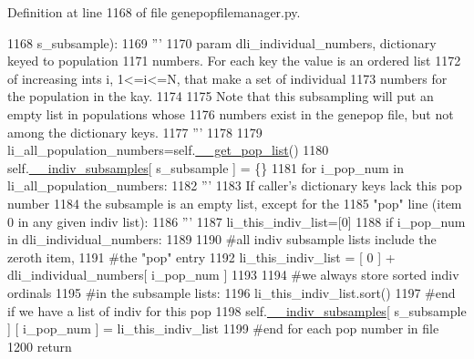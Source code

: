 Definition at line 1168 of file genepopfilemanager.\+py.


\begin{DoxyCode}
1168             s\_subsample):
1169         \textcolor{stringliteral}{'''}
1170 \textcolor{stringliteral}{        param dli\_individual\_numbers, dictionary keyed to population}
1171 \textcolor{stringliteral}{                numbers.  For each key the value is an ordered list}
1172 \textcolor{stringliteral}{                of increasing ints i, 1<=i<=N, that make a set of individual}
1173 \textcolor{stringliteral}{                numbers for the population in the kay.}
1174 \textcolor{stringliteral}{}
1175 \textcolor{stringliteral}{        Note that this subsampling will put an empty list in populations whose}
1176 \textcolor{stringliteral}{        numbers exist in the genepop file, but not among the dictionary keys.}
1177 \textcolor{stringliteral}{        '''}
1178 
1179         li\_all\_population\_numbers=self.\hyperlink{classnegui_1_1genepopfilemanager_1_1GenepopFileManager_a0cd3178624c652968b4d319f12e5df6e}{\_\_get\_pop\_list}()
1180         self.\hyperlink{classnegui_1_1genepopfilemanager_1_1GenepopFileManager_a1e8379bcee4902ca9314ff53fcb71644}{\_\_indiv\_subsamples}[ s\_subsample ] = \{\}
1181         \textcolor{keywordflow}{for} i\_pop\_num \textcolor{keywordflow}{in} li\_all\_population\_numbers:
1182             \textcolor{stringliteral}{'''}
1183 \textcolor{stringliteral}{            If caller's dictionary keys lack this pop number}
1184 \textcolor{stringliteral}{            the subsample is an empty list, except for the}
1185 \textcolor{stringliteral}{            "pop" line (item 0 in any given indiv list):}
1186 \textcolor{stringliteral}{            '''}
1187             li\_this\_indiv\_list=[0]
1188             \textcolor{keywordflow}{if} i\_pop\_num \textcolor{keywordflow}{in} dli\_individual\_numbers:
1189                 
1190                 \textcolor{comment}{#all indiv subsample lists include the zeroth item,}
1191                 \textcolor{comment}{#the "pop" entry}
1192                 li\_this\_indiv\_list =  [ 0 ] +  dli\_individual\_numbers[ i\_pop\_num ] 
1193 
1194                 \textcolor{comment}{#we always store sorted indiv ordinals}
1195                 \textcolor{comment}{#in the subsample lists:}
1196                 li\_this\_indiv\_list.sort()
1197             \textcolor{comment}{#end if we have a list of indiv for this pop}
1198             self.\hyperlink{classnegui_1_1genepopfilemanager_1_1GenepopFileManager_a1e8379bcee4902ca9314ff53fcb71644}{\_\_indiv\_subsamples}[ s\_subsample ] [ i\_pop\_num ] = li\_this\_indiv\_list
1199         \textcolor{comment}{#end for each pop number in file}
1200         \textcolor{keywordflow}{return}
\end{DoxyCode}

